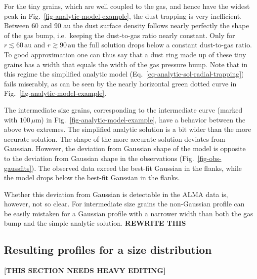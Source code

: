 \documentclass{aa}
\begin{document}
For the tiny grains, which are well coupled to the gas, and hence have the
widest peak in Fig.~\ref{fig-analytic-model-example}, the dust trapping is very
inefficient. Between 60 and 90 au the dust surface density follows nearly
perfectly the shape of the gas bump, i.e.\ keeping the dust-to-gas ratio nearly
constant. Only for $r\lesssim 60\,\mathrm{au}$ and $r\gtrsim 90\,\mathrm{au}$
the full solution drops below a constant dust-to-gas ratio. To good approximation
one can thus say that a dust ring made up of these tiny grains has a width
that equals the width of the gas pressure bump. Note that in this regime the
simplified analytic model (Eq.~\ref{eq-analytic-sol-radial-trapping}) fails
miserably, as can be seen by the nearly horizontal green dotted curve in
Fig.~\ref{fig-analytic-model-example}.

The intermediate size grains, corresponding to the intermediate curve (marked
with $100\,\mu\mathrm{m}$) in Fig.~\ref{fig-analytic-model-example}, have a
behavior between the above two extremes. The simplified analytic solution is a
bit wider than the more accurate solution. The shape of the more accurate
solution deviates from Gaussian. However, the deviation from Gaussian shape of
the model is opposite to the deviation from Gaussian shape in the observations
(Fig.~\ref{fig-obs-gaussfits}). The observed data exceed the best-fit Gaussian
in the flanks, while the model drops below the best-fit Gaussian in the flanks.

Whether this deviation from Gaussian is detectable in the ALMA data is,
however, not so clear. For intermediate size grains the non-Gaussian profile
can be easily mistaken for a Gaussian profile with a narrower width than
both the gas bump and the simple analytic solution. {\bf REWRITE THIS}







\subsection{Resulting profiles for a size distribution}
\label{sec-anmodel-profiles}
%

{\bf [THIS SECTION NEEDS HEAVY EDITING]}
\end{document}

